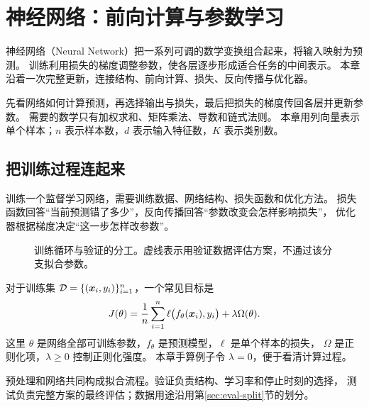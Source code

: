 \chapter{神经网络：前向计算与参数学习}
\label{ch:neural}
\par\smallskip

神经网络（Neural Network）把一系列可调的数学变换组合起来，将输入映射为预测。
训练利用损失的梯度调整参数，使各层逐步形成适合任务的中间表示。
本章沿着一次完整更新，连接结构、前向计算、损失、反向传播与优化器。

\begin{keyidea}[本章阅读路线]
先看网络如何计算预测，再选择输出与损失，最后把损失的梯度传回各层并更新参数。
需要的数学只有加权求和、矩阵乘法、导数和链式法则。
本章用列向量表示单个样本；$n$ 表示样本数，$d$ 表示输入特征数，$K$ 表示类别数。
\end{keyidea}

\section{把训练过程连起来}
\label{sec:training-map}

训练一个监督学习网络，需要训练数据、网络结构、损失函数和优化方法。
损失函数回答“当前预测错了多少”，反向传播回答“参数改变会怎样影响损失”，
优化器根据梯度决定“这一步怎样改参数”。

\begin{figure}[htbp]
\centering

\caption{训练循环与验证的分工。虚线表示用验证数据评估方案，不通过该分支拟合参数。}
\label{fig:training-map}
\par\smallskip
{}
\end{figure}

对于训练集 $\mathcal D=\{(\boldsymbol{x}_i,y_i)\}_{i=1}^n$，一个常见目标是
\begin{equation}
 J(\theta)=\frac1n\sum_{i=1}^n\ell\bigl(f_\theta(\boldsymbol{x}_i),y_i\bigr)
              +\lambda\Omega(\theta).
 \label{eq:nn-objective}
\end{equation}
这里 $\theta$ 是网络全部可训练参数，$f_\theta$ 是预测模型，$\ell$ 是单个样本的损失，
$\Omega$ 是正则化项，$\lambda\geq0$ 控制正则化强度。
本章手算例子令 $\lambda=0$，便于看清计算过程。

预处理和网络共同构成拟合流程。验证负责结构、学习率和停止时刻的选择，
测试负责完整方案的最终评估；数据用途沿用第\ref{sec:eval-split}节的划分。

